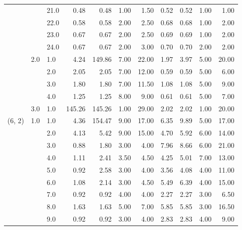 \begin{tabular}{lllrrrrrrrr}
       &     & 21.0 &       0.48 &      0.48 &  1.00 &   1.50 &       0.52 &      0.52 &  1.00 &   1.00 \\
       &     & 22.0 &       0.58 &      0.58 &  2.00 &   2.50 &       0.68 &      0.68 &  1.00 &   2.00 \\
       &     & 23.0 &       0.67 &      0.67 &  2.00 &   2.50 &       0.69 &      0.69 &  1.00 &   2.00 \\
       &     & 24.0 &       0.67 &      0.67 &  2.00 &   3.00 &       0.70 &      0.70 &  2.00 &   2.00 \\
       & 2.0 & 1.0  &       4.24 &    149.86 &  7.00 &  22.00 &       1.97 &      3.97 &  5.00 &  20.00 \\
       &     & 2.0  &       2.05 &      2.05 &  7.00 &  12.00 &       0.59 &      0.59 &  5.00 &   6.00 \\
       &     & 3.0  &       1.80 &      1.80 &  7.00 &  11.50 &       1.08 &      1.08 &  5.00 &   9.00 \\
       &     & 4.0  &       1.25 &      1.25 &  8.00 &   9.00 &       0.61 &      0.61 &  5.00 &   7.00 \\
       & 3.0 & 1.0  &     145.26 &    145.26 &  1.00 &  29.00 &       2.02 &      2.02 &  1.00 &  20.00 \\
(6, 2) & 1.0 & 1.0  &       4.36 &    154.47 &  9.00 &  17.00 &       6.35 &      9.89 &  5.00 &  17.00 \\
       &     & 2.0  &       4.13 &      5.42 &  9.00 &  15.00 &       4.70 &      5.92 &  6.00 &  14.00 \\
       &     & 3.0  &       0.88 &      1.80 &  3.00 &   4.00 &       7.96 &      8.66 &  6.00 &  21.00 \\
       &     & 4.0  &       1.11 &      2.41 &  3.50 &   4.50 &       4.25 &      5.01 &  7.00 &  13.00 \\
       &     & 5.0  &       0.92 &      2.58 &  3.00 &   4.00 &       3.56 &      4.08 &  4.00 &  11.00 \\
       &     & 6.0  &       1.08 &      2.14 &  3.00 &   4.50 &       5.49 &      6.39 &  4.00 &  15.00 \\
       &     & 7.0  &       0.92 &      0.92 &  4.00 &   4.00 &       2.27 &      2.27 &  3.00 &   6.50 \\
       &     & 8.0  &       1.63 &      1.63 &  5.00 &   7.00 &       5.85 &      5.85 &  3.00 &  16.50 \\
       &     & 9.0  &       0.92 &      0.92 &  3.00 &   4.00 &       2.83 &      2.83 &  4.00 &   9.00 \\

\end{tabular}
